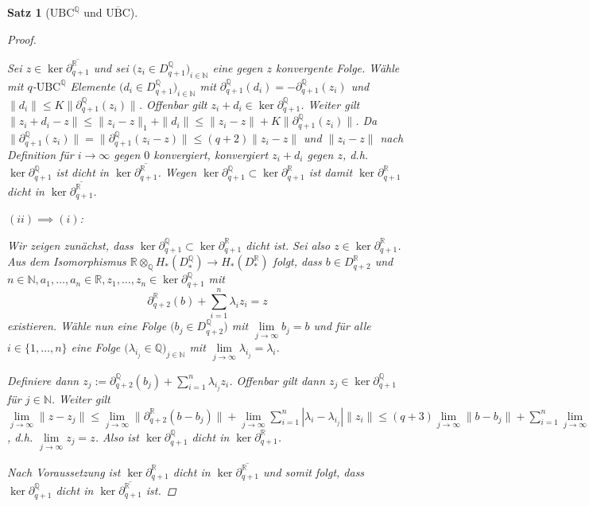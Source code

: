 \documentclass[a4paper,twoside,10pt]{scrreprt}
\newcommand{\UBC}{\text{UBC}}
\newcommand{\N}{\mathbb{N}}
\newcommand{\Q}{\mathbb{Q}}
\newcommand{\R}{\mathbb{R}}
\newtheorem{satz}{Satz}[section]
\theoremstyle{definition}
\begin{document}
\begin{satz}[$\UBC^{\Q}$ und $\overline{\UBC}$]
\begin{proof}
\begin{itemize}
Sei $z\in \ker \overline{\partial_{q+1}^{\R}}$ und sei $\bigl(z_i\in D_{q+1}^{\Q}\bigr)_{i\in \N}$ eine gegen $z$ konvergente Folge. Wähle mit $q$-$\UBC^{\Q}$ Elemente $\bigl(d_i\in D_{q+1}^{\Q}\bigr)_{i\in \N}$ mit $\partial_{q+1}^{\Q}(d_i)=-\partial_{q+1}^{\Q}(z_i)$ und $\|d_i\|\leq K\|\partial_{q+1}^{\Q}(z_i)\|$. Offenbar gilt $z_i+d_i\in \ker \partial_{q+1}^{\Q}$. Weiter gilt $\|z_i+d_i-z\|\leq \|z_i-z\|_1+\|d_i\|\leq\|z_i-z\|+K\|\partial_{q+1}^{\Q}(z_i)\|$. Da $\|\partial_{q+1}^{\Q}(z_i)\|=\|\partial_{q+1}^{\Q}(z_i-z)\|\leq (q+2)\|z_i-z\|$ und $\|z_i-z\|$ nach Definition für $i\to \infty$ gegen $0$ konvergiert, konvergiert $z_i+d_i$ gegen $z$, d.h. $\ker \partial_{q+1}^{\Q}$ ist dicht in $\ker \overline{\partial_{q+1}^{\R}}$. Wegen $\ker \partial_{q+1}^{\Q}\subset\ker \partial_{q+1}^{\R}$ ist damit $\ker \partial_{q+1}^{\R}$ dicht in $\ker \overline{\partial_{q+1}^{\R}}$.
\end{itemize}
$(ii)\implies(i)$:\par
Wir zeigen zunächst, dass $\ker\partial_{q+1}^{\Q}\subset \ker\partial_{q+1}^{\R}$ dicht ist. Sei also $z\in \ker\partial_{q+1}^{\R}$. Aus dem Isomorphismus $\R\otimes_{\Q}H_*(D_*^{\Q})\to H_*(D_*^{\R})$ folgt, dass $b\in D_{q+2}^{\R}$ und $n\in\N,a_1,\ldots,a_n\in\R,z_1,\ldots,z_n\in \ker\partial_{q+1}^{\Q}$ mit 
\begin{equation*}
\partial_{q+2}^{\R}(b)+\sum\limits_{i=1}^n\lambda_iz_i=z
\end{equation*}
existieren. Wähle nun eine Folge $\bigl(b_j\in D_{q+2}^{\Q}\bigr)$ mit $\lim\limits_{j\to\infty}b_j=b$ und für alle $i\in \{1,\ldots,n\}$ eine Folge $\bigl(\lambda_{i_j}\in\Q\bigr)_{j\in\N}$ mit $\lim\limits_{j\to\infty}\lambda_{i_j}=\lambda_i$.\par
Definiere dann $z_j:=\partial_{q+2}^{\Q}(b_j)+\sum\limits_{i=1}^n\lambda_{i_j}z_i$. Offenbar gilt dann $z_j\in\ker\partial_{q+1}^{\Q}$ für $j\in\N$. Weiter gilt $\lim\limits_{j\to\infty}\|z-z_j\|\leq \lim\limits_{j\to\infty}\|\partial_{q+2}^{\R}(b-b_j)\|+\lim\limits_{j\to\infty}\sum\limits_{i=1}^n|\lambda_i-\lambda_{i_j}|\|z_i\|\leq (q+3)\lim\limits_{j\to\infty}\|b-b_j\|+\sum\limits_{i=1}^n\lim\limits_{j\to\infty}|\lambda_i-\lambda_{i_j}|\|z_i\|=0$, d.h. $\lim\limits_{j\to\infty}z_j=z$. Also ist $\ker\partial_{q+1}^{\Q}$ dicht in $\ker\partial_{q+1}^{\R}$.\par
Nach Voraussetzung ist $\ker \partial_{q+1}^{\R}$ dicht in $\ker \overline{\partial_{q+1}^{\R}}$ und somit folgt, dass $\ker \partial_{q+1}^{\Q}$ dicht in $\ker \overline{\partial_{q+1}^{\R}}$ ist.\par

\end{proof}
\end{satz}
\end{document}
